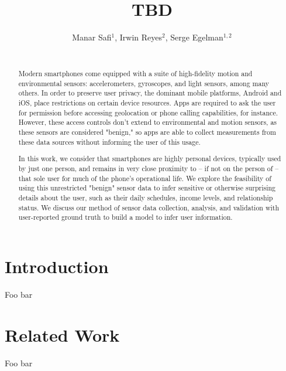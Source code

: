 \documentclass{sig-alternate-10pt}
\begin{document}
\title{TBD}


\author{
\alignauthor
    Manar Safi$^1$, Irwin Reyes$^2$, Serge Egelman$^{1,2}$ \\ \vspace{2mm}
     \\
}

\maketitle
\begin{abstract}

Modern smartphones come equipped with a suite of high-fidelity motion and environmental
sensors: accelerometers, gyroscopes, and light sensors, among many others. In order to
preserve user privacy, the dominant mobile platforms, Android and iOS, place restrictions
on certain device resources. Apps are required to ask the user for permission before accessing
geolocation or phone calling capabilities, for instance. However, these access controls
don't extend to environmental and motion sensors, as these sensors are considered "benign,"
so apps are able to collect measurements from these data sources without informing
the user of this usage.

In this work, we consider that smartphones are highly personal devices, typically used
by just one person, and remains in very close proximity to -- if not on the person of -- that sole user for much of
the phone's operational life. We explore the feasibility of using this unrestricted 
"benign" sensor data to infer sensitive or otherwise surprising details about the user,
such as their daily schedules, income levels, and relationship status. We discuss our
method of sensor data collection, analysis, and validation with user-reported ground
truth to build a model to infer user information.

\end{abstract}

\section{Introduction}

Foo bar~\cite{sensor-types}

\section{Related Work}

Foo bar
\end{document}
